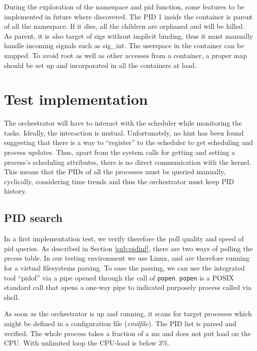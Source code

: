 \documentclass[]{scrartcl}
\begin{document}
During the exploration of the namespace and pid function, some features to be implemented in future where discovered. 
The PID 1 inside the container is parent of all the namespace. If it dies, all the children are orphaned and will be killed. As parent, it is also target of sigs without implicit binding, thus it must manually handle incoming signals such as sig\_int.
The userspace in the container can be mapped. To avoid root as well as other accesses from a container, a proper map should be set up and incorporated in all the containers at load.

\section{Test implementation}

The orchestrator will have to interact with the scheduler while monitoring the tasks. 
Ideally, the interaction is mutual. Unfortunately, no hint has been found suggesting that there is a way to ``register'' to the scheduler to get scheduling and process updates. 
Thus, apart from the system calls for getting and setting a process's scheduling attributes, there is no direct communication with the kernel. 
This means that the PIDs of all the processes must be queried manually, cyclically, considering time trends and thus the orchestrator must keep PID history. 

\subsection{PID search}

In a first implementation test, we verify therefore the poll quality and speed of pid queries.
As described in Section \ref{sub:pidinf}, there are two ways of polling the prcess table. 
In our testing environment we use Linux, and are therefore running for a virtual filesystems parsing. 
To ease the parsing, we can use the integrated tool ``pidof'' via a pipe opened through the call of \texttt{popen}.
\texttt{popen} is a POSIX standard call that opens a one-way pipe to indicated  purposely process called via shell.

As soon as the orchestrator is up and running, it scans for target processes which might be  defined in a configuration file (\textit{cmdfile}).
The PID list is parsed and verified. 
The whole process takes a fraction of a ms and does not put load on the {CPU}. With unlimited loop the {CPU}-load is below 3\%.
\end{document}
